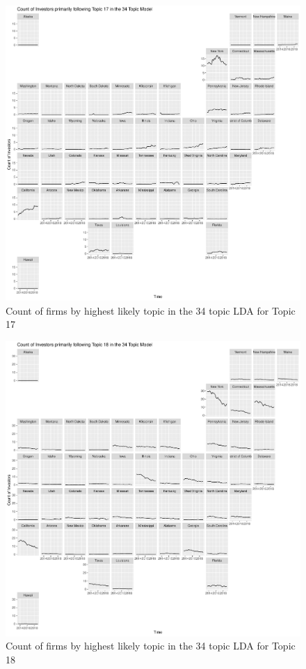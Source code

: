 		\begin{figure}
		\centering
		\includegraphics[width=1\linewidth]{Figures/ChapterV/USA_34_Topic17.pdf}
		\caption[Count of Firms for Topic 17 by Quarter]{Count of firms by highest likely topic in the 34 topic LDA for Topic 17}
		\label{fig:StateLDA17}
	\end{figure}
	
		\begin{figure}
		\centering
		\includegraphics[width=1\linewidth]{Figures/ChapterV/USA_34_Topic18.pdf}
		\caption[Count of Firms for Topic 18 by Quarter]{Count of firms by highest likely topic in the 34 topic LDA for Topic 18}
		\label{fig:StateLDA18}
	\end{figure}
	
